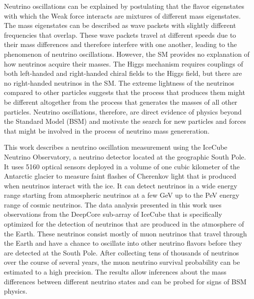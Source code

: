 Neutrino oscillations can be explained by postulating that the flavor eigenstates with which the Weak force interacts are mixtures of different mass eigenstates.
The mass eigenstates can be described as wave packets with slightly different frequencies that overlap.
These wave packets travel at different speeds due to their mass differences and therefore interfere with one another, leading to the phenomenon of neutrino oscillations.
However, the SM provides no explanation of how neutrinos acquire their masses.
The Higgs mechanism requires couplings of both left-handed and right-handed chiral fields to the Higgs field, but there are no right-handed neutrinos in the SM.
The extreme lightness of the neutrinos compared to other particles suggests that the process that produces them might be different altogether from the process that generates the masses of all other particles.
Neutrino oscillations, therefore, are direct evidence of physics beyond the Standard Model (BSM) and motivate the search for new particles and forces that might be involved in the process of neutrino mass genereration.

This work describes a neutrino oscillation measurement using the IceCube Neutrino Observatory, a neutrino detector located at the geographic South Pole.
It uses 5160 optical sensors deployed in a volume of one cubic kilometer of the Antarctic glacier to measure faint flashes of Cherenkov light that is produced when neutrinos interact with the ice.
It can detect neutrinos in a wide energy range starting from atmospheric neutrinos at a few GeV up to the PeV energy range of cosmic neutrinos.
The data analysis presented in this work uses observations from the DeepCore sub-array of IceCube that is specifically optimized for the detection of neutrinos that are produced in the atmosphere of the Earth.
These neutrinos consist mostly of muon neutrinos that travel through the Earth and have a chance to oscillate into other neutrino flavors before they are detected at the South Pole.
After collecting tens of thousands of neutrinos over the course of several years, the muon neutrino survival probability can be estimated to a high precision.
The results allow inferences about the mass differences between different neutrino states and can be probed for signs of BSM physics.

